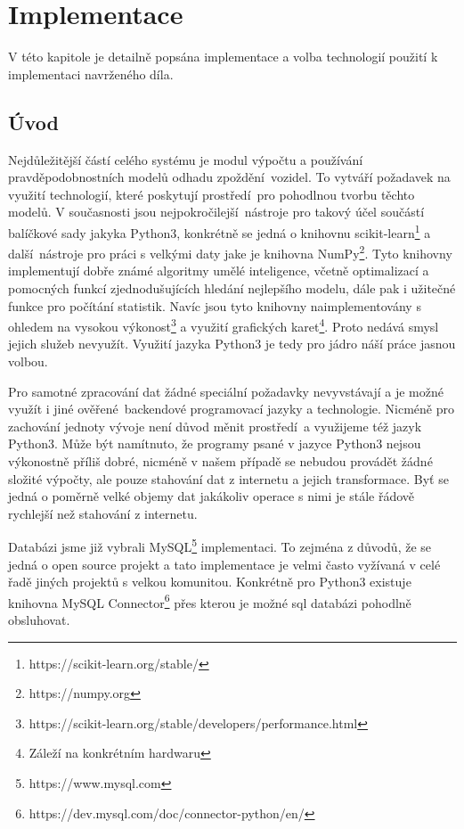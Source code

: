 
\chapter{Implementace} \label{chapter:implementace}

V této kapitole je detailně popsána implementace a volba technologií použití k implementaci navrženého díla.

\section{Úvod}

Nejdůležitější částí celého systému je modul výpočtu a používání pravděpodobnostních modelů odhadu zpoždění vozidel. To vytváří požadavek na využití technologií, které poskytují prostředí pro pohodlnou tvorbu těchto modelů. V současnosti jsou nejpokročilejší nástroje pro takový účel součástí balíčkové sady jakyka Python3, konkrétně se jedná o knihovnu scikit-learn\footnote{https://scikit-learn.org/stable/} a další nástroje pro práci s velkými daty jake je knihovna NumPy\footnote{https://numpy.org}. Tyto knihovny implementují dobře známé algoritmy umělé inteligence, včetně optimalizací a pomocných funkcí zjednodušujících hledání nejlepšího modelu, dále pak i užitečné funkce pro počítání statistik. Navíc jsou tyto knihovny naimplementovány s ohledem na vysokou výkonost\footnote{https://scikit-learn.org/stable/developers/performance.html} a využití grafických karet\footnote{Záleží na konkrétním hardwaru}. Proto nedává smysl jejich služeb nevyužít. Využití jazyka Python3 je tedy pro jádro náší práce jasnou volbou.

\bigbreak

Pro samotné zpracování dat žádné speciální požadavky nevyvstávají a je možné využít i jiné ověřené backendové programovací jazyky a technologie. Nicméně pro zachování jednoty vývoje není důvod měnit prostředí a využijeme též jazyk Python3. Může být namítnuto, že programy psané v jazyce Python3 nejsou výkonostně příliš dobré, nicméně v našem případě se nebudou provádět žádné složité výpočty, ale pouze stahování dat z internetu a jejich transformace. Byť se jedná o poměrně velké objemy dat jakákoliv operace s nimi je stále řádově rychlejší než stahování z internetu.

\bigbreak

Databázi jsme již vybrali MySQL\footnote{https://www.mysql.com} implementaci. To zejména z důvodů, že se jedná o open source projekt a tato implementace je velmi často vyžívaná v celé řadě jiných projektů s velkou komunitou. Konkrétně pro Python3 existuje knihovna MySQL Connector\footnote{https://dev.mysql.com/doc/connector-python/en/} přes kterou je možné \gls{sql} databázi pohodlně obsluhovat.

